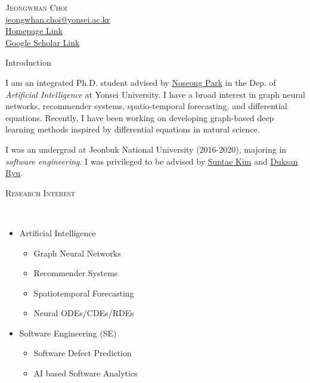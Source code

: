\documentclass[10pt]{article}
\newenvironment{changemargin}[2]{
  \begin{list}{}{
    \setlength{\topsep}{0pt}
    \setlength{\leftmargin}{#1}
    \setlength{\rightmargin}{#2}
    \setlength{\listparindent}{\parindent}
    \setlength{\itemindent}{\parindent}
    \setlength{\parsep}{\parskip}
  }
  \item[]}{\end{list}
}
\newcommand{\lineover}{
	\begin{changemargin}{-0.05in}{-0.05in}
		\vspace*{-8pt}
		\hrulefill \\
		\vspace*{-2pt}
	\end{changemargin}
}
\newcommand{\header}[1]{
	\begin{changemargin}{-0.5in}{-0.5in}
		\scshape{#1}\\
  	\lineover
	\end{changemargin}
}
\newcommand{\contact}[5]{
	\begin{changemargin}{-0.5in}{-0.5in}
		\begin{center}
			{\Large \scshape {#1}}\\
      {#2} \\  {#3} \\ {#4} \\ {#5}
		\end{center}
	\end{changemargin}
}
\newenvironment{body} {
	\vspace*{-16pt}
	\begin{changemargin}{-0.25in}{-0.5in}
  }
	{\end{changemargin}
}
\begin{document}

\vspace{10pt}

\contact{Jeongwhan Choi}{\href{mailto:email@address.com}{jeongwhan.choi@yonsei.ac.kr}}{\href{https://jeongwhanchoi.me}{Homepage Link}}{\href{https://scholar.google.com/citations?user=3MNElkYAAAAJ&hl=en}{Google Scholar Link}}

\header{Introduction}
\begin{body}
    \vspace{14pt}
 I am an integrated Ph.D. student advised by \href{https://scholar.google.com/citations?user=VSuM3gYAAAAJ&hl=en}{Noseong Park} in the Dep. of \emph{Artificial Intelligence} at Yonsei University. I have a broad interest in graph neural networks, recommender systems, spatio-temporal forecasting, and differential equations. Recently, I have been working on developing graph-based deep learning methods inspired by differential equations in natural science.

I was an undergrad at Jeonbuk National University (2016-2020), majoring in \emph{software engineering}. I was privileged to be advised by \href{https://scholar.google.com/citations?user=IN_HTKEAAAAJ&hl=en}{Suntae Kim} and \href{https://scholar.google.com/citations?user=BHue-MMAAAAJ&hl=en}{Duksan Ryu}.
\end{body}

\medskip

\header{Research Interest}

\begin{body}
    \vspace{14pt}
    \begin{itemize}
        \item Artificial Intelligence
        \begin{itemize}
            \item Graph Neural Networks
            \item Recommender Systems
            \item Spatiotemporal Forecasting
            \item Neural ODEs/CDEs/RDEs
        \end{itemize}
        \item Software Engineering (SE)
        \begin{itemize}
            \item Software Defect Prediction
            \item AI based Software Analytics
        \end{itemize}
    \end{itemize}
\end{body}
\medskip
\end{document}
